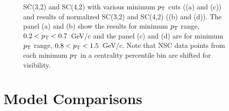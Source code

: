 \begin{figure}
\begin{center}
        \caption{SC(3,2) and SC(4,2) with various minimum $p_{\rm T}$ cuts ((a) and (c)) and results of normalized SC(3,2) and SC(4,2) ((b) and (d)). The panel (a) and (b) show the results for minimum $p_{\rm T}$ range, $0.2<p_{\rm T}<0.7$~GeV/$c$ and the panel (c) and (d) are for minimum $p_{\rm T}$ range, $0.8<p_{\rm T}<1.5$~GeV/$c$. Note that NSC data points from each minimum $p_{\rm T}$ in a centrality percentile bin are shifted for visibility.}
        \label{fig:Figure_2}
        \end{center}   
\end{figure}
 

\section{Model Comparisons}
\label{sec:theory}
